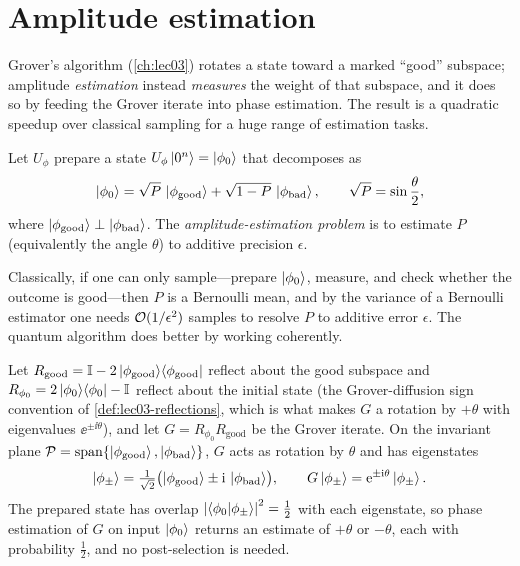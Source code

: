 \section{Amplitude estimation}
\label{sec:lec05-2}

Grover's algorithm (\cref{ch:lec03}) rotates a state toward a marked ``good''
subspace; amplitude \emph{estimation} instead \emph{measures} the weight of that
subspace, and it does so by feeding the Grover iterate into phase estimation. The
result is a quadratic speedup over classical sampling for a huge range of
estimation tasks.

\begin{definition}
\label{def:lec05-ae}
Let $U_{\phi}$ prepare a state $U_{\phi}\ket{0^n}=\ket{\phi_0}$ that decomposes as
\begin{equation}
  \ket{\phi_0}=\sqrt{P}\,\ket{\phi_{\mathrm{good}}}
              +\sqrt{1-P}\,\ket{\phi_{\mathrm{bad}}},
  \qquad \sqrt{P}=\sin\frac{\theta}{2},
  \label{eq:lec05-aedecomp}
\end{equation}
where $\ket{\phi_{\mathrm{good}}}\perp\ket{\phi_{\mathrm{bad}}}$. The
\emph{amplitude-estimation problem} is to estimate $P$ (equivalently the angle
$\theta$) to additive precision $\epsilon$.
\end{definition}

Classically, if one can only sample---prepare $\ket{\phi_0}$, measure, and check
whether the outcome is good---then $P$ is a Bernoulli mean, and by the variance of
a Bernoulli estimator one needs $\mathcal{O}(1/\epsilon^2)$ samples to resolve $P$ to
additive error $\epsilon$. The quantum algorithm does better by working
coherently.

\begin{theorem}
\label{thm:lec05-ae}
Let $R_{\mathrm{good}}=\mathbb{I}-2\ket{\phi_{\mathrm{good}}}\!\bra{\phi_{\mathrm{good}}}$ reflect about the good
subspace and $R_{\phi_0}=2\ket{\phi_0}\!\bra{\phi_0}-\mathbb{I}$ reflect about the initial state (the
Grover-diffusion sign convention of \cref{def:lec03-reflections}, which is what makes
$G$ a rotation by $+\theta$ with eigenvalues $\ee^{\pm\ii\theta}$), and
let $G=R_{\phi_0}R_{\mathrm{good}}$ be the Grover iterate. On the invariant plane
$\mathcal P=\operatorname{span}\{\ket{\phi_{\mathrm{good}}},
\ket{\phi_{\mathrm{bad}}}\}$, $G$ acts as rotation by $\theta$ and has eigenstates
\[
  \ket{\phi_{\pm}}=\tfrac{1}{\sqrt2}\bigl(\ket{\phi_{\mathrm{good}}}
                    \pm\mathrm{i}\,\ket{\phi_{\mathrm{bad}}}\bigr),
  \qquad G\ket{\phi_{\pm}}=\mathrm{e}^{\pm\mathrm{i}\theta}\ket{\phi_{\pm}}.
\]
The prepared state has overlap $\left\lvert \braket{\phi_0|\phi_{\pm}} \right\rvert^2=\tfrac12$ with
each eigenstate, so phase estimation of $G$ on input $\ket{\phi_0}$ returns an
estimate of $+\theta$ or $-\theta$, each with probability $\tfrac12$, and no
post-selection is needed.
\end{theorem}

